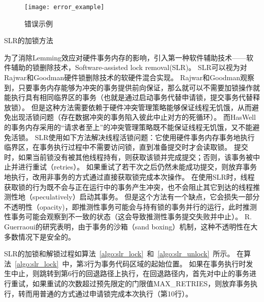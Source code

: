 \begin{figure}[htbp]
\centering
\texttt{[image: error\_example]}
\caption{错误示例}\label{fig:error_example}
\end{figure}

\begin{algorithm}[htbp]
\SetAlgoLined
{}
\caption{SLR的加锁方法}
\label{algo:slr_lock}
\end{algorithm}

为了消除Lemming效应对硬件事务内存的影响，引入第一种软件辅助技术——软件辅助的锁删除技术，Software-assisted lock removal(SLR)。
SLR可以视为对Rajwar和Goodman\cite{rajwar2002transactional}硬件锁删除技术的软硬件混合实现。
Rajwar和Goodman\cite{rajwar2002transactional}观察到，只要事务内存能够为冲突的事务提供前向保证，那么就可以不需要加锁操作就能执行具有相同临界区的事务（也就是通过启动事务代替申请锁，提交事务代替释放锁）。
但是这种方法需要依赖于硬件冲突管理策略能够保证线程无饥饿，从而避免出现活锁问题（存在数据冲突的事务陷入彼此中止对方的死循环）。
而HasWell的事务内存采用的“请求者至上”的冲突管理策略既不能保证线程无饥饿，又不能避免活锁。
SLR使用如下方法解决线程活锁问题：它使用硬件事务内存事务地执行临界区，在事务执行过程中不需要访问锁，直到准备提交时才会读取锁。
提交时，如果当前锁没有被其他线程持有，则获取该锁并完成提交；否则，该事务被中止并进行重试（retries）。
如果重试了若干次之后仍然未能成功提交，则放弃事务地执行，改用非事务的方式通过直接获取锁完成本次操作。
在使用SLR时，线程获取锁的行为既不会与正在运行中的事务产生冲突，也不会阻止其它到达的线程推测性地（speculatively）启动其事务。
但是这个方法有一个缺点，它会损失一部分不透明性（opacity)，即推测性事务可能会与持有锁的事务并行的运行，此时推测性事务可能会观察到不一致的状态（这会导致推测性事务提交失败并中止）。
R. Guerraoui\cite{guerraoui2008correctness}的研究表明，由于事务的沙箱（sand boxing）机制，这种不透明性在大多数情况下是安全的。

SLR的加锁和解锁过程如算法~\ref{algo:slr_lock}~和~\ref{algo:slr_unlock}~所示。
在算法~\ref{algo:slr_lock}~中，第3行为事务代码区域的起始位置。
如果在事务执行时发生中止，则跳转到第6行的回退路径上执行，在回退路径内，首先对中止的事务进行重试，如果重试的次数超过预先限定的门限值MAX\_RETRIES，则放弃事务执行，转而用普通的方式通过申请锁完成本次执行（第10行）。

